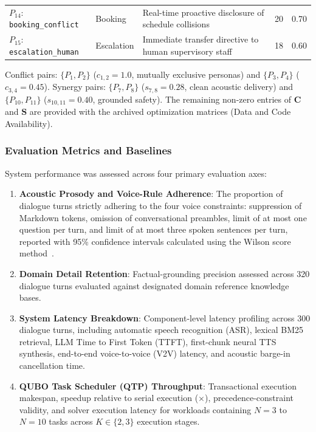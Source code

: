 \documentclass[review,12pt,times,authoryear]{elsarticle}
\theoremstyle{definition}
\begin{document}
\begin{table}[t]
\begin{tabularx}{\columnwidth}{@{}llXrr@{}}
$P_{14}$: \texttt{booking\_conflict}  & Booking & Real-time proactive disclosure of schedule collisions & 20 & 0.70 \\
$P_{15}$: \texttt{escalation\_human}  & Escalation & Immediate transfer directive to human supervisory staff & 18 & 0.60 \\
\bottomrule
\end{tabularx}
\vspace{2pt}\par\raggedright\footnotesize{Conflict pairs: $\{P_1, P_2\}$ ($c_{1,2} = 1.0$, mutually exclusive personas) and $\{P_3, P_4\}$ ($c_{3,4} = 0.45$). Synergy pairs: $\{P_7, P_8\}$ ($s_{7,8} = 0.28$, clean acoustic delivery) and $\{P_{10}, P_{11}\}$ ($s_{10,11} = 0.40$, grounded safety). The remaining non-zero entries of $\mathbf{C}$ and $\mathbf{S}$ are provided with the archived optimization matrices (Data and Code Availability).}
\end{table}

\subsubsection{Evaluation Metrics and Baselines}
System performance was assessed across four primary evaluation axes:
\begin{enumerate}
  \item \textbf{Acoustic Prosody and Voice-Rule Adherence}: The proportion of dialogue turns strictly adhering to the four voice constraints: suppression of Markdown tokens, omission of conversational preambles, limit of at most one question per turn, and limit of at most three spoken sentences per turn, reported with 95\% confidence intervals calculated using the Wilson score method~\citep{wilson1927}.
  \item \textbf{Domain Detail Retention}: Factual-grounding precision assessed across 320 dialogue turns evaluated against designated domain reference knowledge bases.
  \item \textbf{System Latency Breakdown}: Component-level latency profiling across 300 dialogue turns, including automatic speech recognition (ASR), lexical BM25 retrieval, LLM Time to First Token (TTFT), first-chunk neural TTS synthesis, end-to-end voice-to-voice (V2V) latency, and acoustic barge-in cancellation time.
  \item \textbf{QUBO Task Scheduler (QTP) Throughput}: Transactional execution makespan, speedup relative to serial execution ($\times$), precedence-constraint validity, and solver execution latency for workloads containing $N = 3$ to $N = 10$ tasks across $K \in \{2, 3\}$ execution stages.
\end{enumerate}
\end{document}
